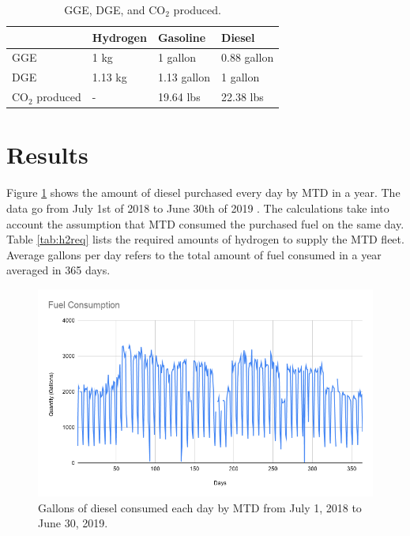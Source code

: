 \documentclass{anstrans}
\begin{document}
\begin{table}[!h]
	\centering
    \caption{GGE, DGE, and CO$_2$ produced.}
    \label{tab:meth}
	\begin{tabular}{l|lll}
	\hline
	                 & Hydrogen & Gasoline    & Diesel      \\ \hline
	GGE              & 1 kg     & 1 gallon    & 0.88 gallon \\
	DGE              & 1.13 kg  & 1.13 gallon & 1 gallon    \\
    CO$_2$ produced  & -        & 19.64 lbs   & 22.38 lbs   \\ \hline

	\end{tabular}
\end{table}

\section{Results}

Figure \ref{fig:mtdfuel} shows the amount of diesel purchased every day by MTD in a year. The data go from July 1st of 2018 to June 30th of 2019 \cite{mtd_irecords_2019}. The calculations take into account the assumption that MTD consumed the purchased fuel on the same day.
Table \ref{tab:h2req} lists the required amounts of hydrogen to supply the MTD fleet. Average gallons per day refers to the total amount of fuel consumed in a year averaged in 365 days. 

\begin{figure}[!h]
	\centering
	\includegraphics[width=1.05\linewidth]{figures/fuelconsumption.png}
	\hfill
	\caption{Gallons of diesel consumed each day by MTD from July 1, 2018 to June 30, 2019.}
	\label{fig:mtdfuel}
\end{figure}
\end{document}
